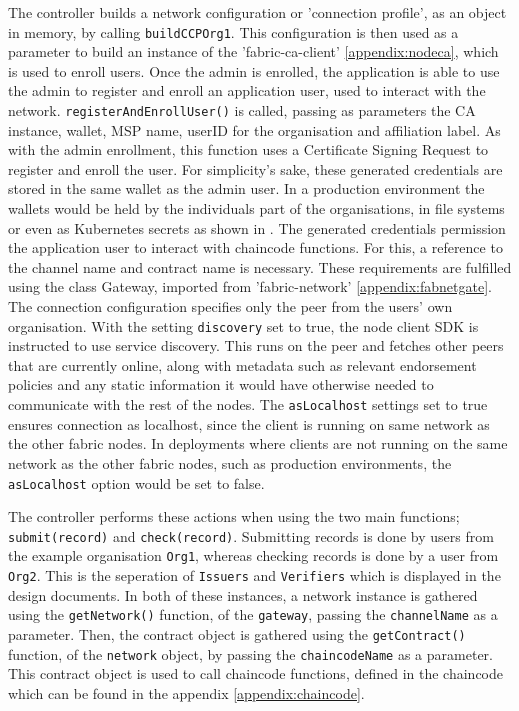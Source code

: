 The controller builds a network configuration or 'connection profile', as an object in memory, by calling \lstinline{buildCCPOrg1}. 
This configuration is then used as a parameter to build an instance of the 'fabric-ca-client' \ref{appendix:nodeca}, which is used to enroll users. 
Once the admin is enrolled, the application is able to use the admin to register and enroll an application user, used to interact with the network. 
\lstinline{registerAndEnrollUser()} is called, passing as parameters the CA instance, wallet, MSP name, userID for the organisation and affiliation label. 
As with the admin enrollment, this function uses a Certificate Signing Request to register and enroll the user. 
For simplicity's sake, these generated credentials are stored in the same wallet as the admin user. 
In a production environment the wallets would be held by the individuals part of the organisations, in file systems or even as Kubernetes secrets as shown in \cite{noauthor_use_nodate}. 
The generated credentials permission the application user to interact with chaincode functions. 
For this, a reference to the channel name and contract name is necessary.
These requirements are fulfilled using the class Gateway, imported from 'fabric-network' \ref{appendix:fabnetgate}. 
The connection configuration specifies only the peer from the users' own organisation. 
With the setting \lstinline{discovery} set to true, the node client SDK is instructed to use service discovery. 
This runs on the peer and fetches other peers that are currently online, along with metadata such as relevant endorsement policies and any static information it would have otherwise needed to communicate with the rest of the nodes. 
The \lstinline{asLocalhost} settings set to true ensures connection as localhost, since the client is running on same network as the other fabric nodes. 
In deployments where clients are not running on the same network as the other fabric nodes, such as production environments, the \lstinline{asLocalhost} option would be set to false. \cite{noauthor_running_nodate} 

The controller performs these actions when using the two main functions; \lstinline{submit(record)} and \lstinline{check(record)}.
Submitting records is done by users from the example organisation \lstinline{Org1}, whereas checking records is done by a user from \lstinline{Org2}. 
This is the seperation of \lstinline{Issuers} and \lstinline{Verifiers} which is displayed in the design documents. 
In both of these instances, a network instance is gathered using the \lstinline{getNetwork()} function, of the \lstinline{gateway}, passing the \lstinline{channelName} as a parameter. 
Then, the contract object is gathered using the \lstinline{getContract()} function, of the \lstinline{network} object, by passing the \lstinline{chaincodeName} as a parameter.
This contract object is used to call chaincode functions, defined in the chaincode which can be found in the appendix \ref{appendix:chaincode}.

